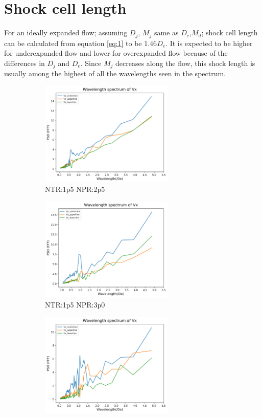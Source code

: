 \section{Shock cell length}
For an ideally expanded flow; assuming $D_j$, $M_j$ same as $D_e$,$M_d$; shock cell length can be calculated from equation \ref{eq:1}  to be 1.46$D_e$. It is expected to be higher for underexpanded flow and lower for overexpanded flow because of the differences in $D_j$ and $D_e$. Since $M_j$ decreases along the flow, this shock length is usually among the highest of all the wavelengths seen in the spectrum.\\ 

\begin{figure}[H]
\begin{subfigure}{.5\textwidth}
	\centering
	\includegraphics[width=2.5in]{images/Fft_Vx_NTR1p5_NPR2p5.png}
	\caption{NTR:1p5 NPR:2p5 }
	\label{fig:setup1}
\end{subfigure}%
\begin{subfigure}{.5\textwidth}
	\centering
	\includegraphics[width=2.5in]{images/Fft_Vx_NTR1p5_NPR3p0.png}
	\caption{NTR:1p5 NPR:3p0 }
	\label{fig:setup2}
\end{subfigure}
\begin{subfigure}{0.5\textwidth}
	\centering
	\includegraphics[width=2.5in]{images/Fft_Vx_NTR1p5_NPR3p6.png}

\end{subfigure}
\end{figure}
